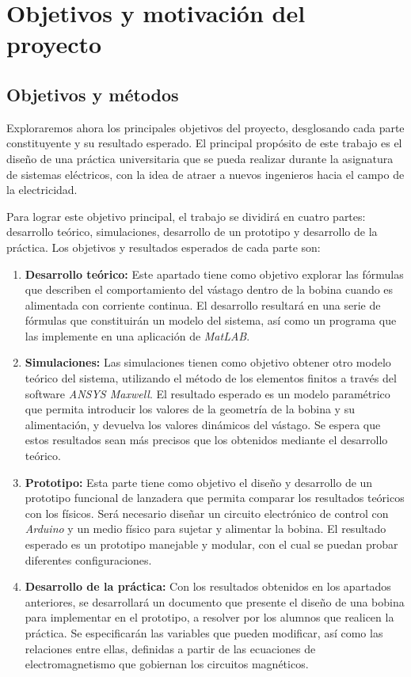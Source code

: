 \section{Objetivos y motivación del proyecto}
\label{sec:motivacionyobjetivos}

\subsection{Objetivos y métodos}
Exploraremos ahora los principales objetivos del proyecto, desglosando cada parte constituyente y su resultado esperado. El principal propósito de este trabajo es el diseño de una práctica universitaria que se pueda realizar durante la asignatura de sistemas eléctricos, con la idea de atraer a nuevos ingenieros hacia el campo de la electricidad.

Para lograr este objetivo principal, el trabajo se dividirá en cuatro partes: desarrollo teórico, simulaciones, desarrollo de un prototipo y desarrollo de la práctica. Los objetivos y resultados esperados de cada parte son:

\begin{enumerate}
    \item \textbf{Desarrollo teórico:} Este apartado tiene como objetivo explorar las fórmulas que describen el comportamiento del vástago dentro de la bobina cuando es alimentada con corriente continua. El desarrollo resultará en una serie de fórmulas que constituirán un modelo del sistema, así como un programa que las implemente en una aplicación de \textit{MatLAB\textregistered}.
    \item \textbf{Simulaciones:} Las simulaciones tienen como objetivo obtener otro modelo teórico del sistema, utilizando el método de los elementos finitos a través del software \textit{ANSYS Maxwell\textregistered}. El resultado esperado es un modelo paramétrico que permita introducir los valores de la geometría de la bobina y su alimentación, y devuelva los valores dinámicos del vástago. Se espera que estos resultados sean más precisos que los obtenidos mediante el desarrollo teórico.
    \item \textbf{Prototipo:} Esta parte tiene como objetivo el diseño y desarrollo de un prototipo funcional de lanzadera que permita comparar los resultados teóricos con los físicos. Será necesario diseñar un circuito electrónico de control con \textit{Arduino\textregistered} y un medio físico para sujetar y alimentar la bobina. El resultado esperado es un prototipo manejable y modular, con el cual se puedan probar diferentes configuraciones.
    \item \textbf{Desarrollo de la práctica:} Con los resultados obtenidos en los apartados anteriores, se desarrollará un documento que presente el diseño de una bobina para implementar en el prototipo, a resolver por los alumnos que realicen la práctica. Se especificarán las variables que pueden modificar, así como las relaciones entre ellas, definidas a partir de las ecuaciones de electromagnetismo que gobiernan los circuitos magnéticos.
\end{enumerate}

